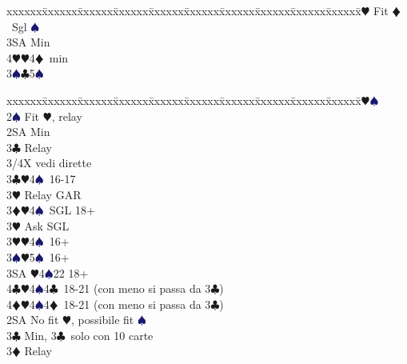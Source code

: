 \documentclass[a4paper,italian]{article}
\newcommand{\BC}{\textcolor{OliveGreen}{$\clubsuit$}}
\newcommand{\BD}{\textcolor{RedOrange}{$\vardiamondsuit$}}
\newcommand{\BH}{\textcolor{Red2}{$\varheartsuit${}}}
\newcommand{\BS}{\textcolor{MidnightBlue}{$\spadesuit${}}}
\newenvironment{bidtable}
{\begin{tabbing}

    xxxxxx\=xxxxxx\=xxxxxx\=xxxxxx\=xxxxxx\=xxxxxx\=xxxxxx\=xxxxxx\=xxxxxx\=xxxxxx\=\kill}
{\end{tabbing} }%
\begin{document}
\begin{multicols}{2}
\begin{bidtable}
                                            3\BH \> Fit \BD\ Sgl \BS \+\\
                                            3SA \> Min\\
                                            4\BH {}\BH 4\BD\ min\-\\
                                            3\BS {}\BC 5\BS \-\\
                                        \end{bidtable}
                                        \columnbreak
                                        \begin{bidtable}
                                            2\BH {}\BS \+\\
                                            2\BS \> Fit \BH , relay\+\\
                                            2SA \> Min\+\\
                                            3\BC \> Relay\+\\
                                            3/4X \> vedi dirette\-\-\\
                                            3\BC {}\BH 4\BS\ 16-17\+\\
                                            3\BH \> Relay GAR\-\\
                                            3\BD {}\BH 4\BS\ SGL 18+\+\\
                                            3\BH \> Ask SGL\-\\
                                            3\BH {}\BH 4\BS\ 16+\\
                                            3\BS {}\BH 5\BS\ 16+\\
                                            3SA \BH 4\BS 22 18+\\
                                            4\BC {}\BH 4\BS 4\BC\ 18-21 (con meno si passa da 3\BC )\\
                                            4\BD {}\BH 4\BS 4\BD\ 18-21 (con meno si passa da 3\BC )\-\\
                                            2SA \> No fit \BH , possibile fit \BS\+\\
                                            3\BC \> Min, 3\BC\ solo con 10 carte\+\\
                                            3\BD \> Relay\+\\

\end{bidtable}
\end{multicols}
\end{document}
